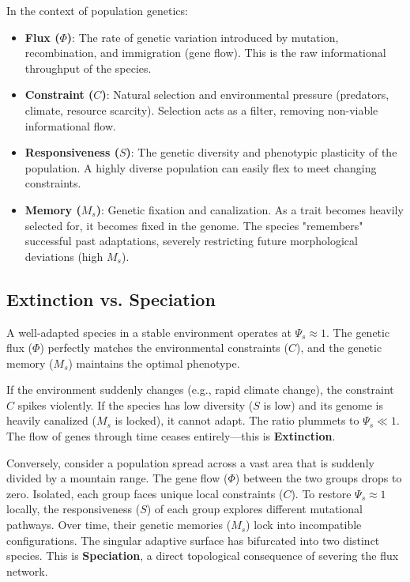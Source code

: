\documentclass[11pt,a4paper]{article}
\begin{document}
In the context of population genetics:
\begin{itemize}
    \item \textbf{Flux ($\Phi$)}: The rate of genetic variation introduced by mutation, recombination, and immigration (gene flow). This is the raw informational throughput of the species.
    \item \textbf{Constraint ($C$)}: Natural selection and environmental pressure (predators, climate, resource scarcity). Selection acts as a filter, removing non-viable informational flow.
    \item \textbf{Responsiveness ($S$)}: The genetic diversity and phenotypic plasticity of the population. A highly diverse population can easily flex to meet changing constraints.
    \item \textbf{Memory ($M_s$)}: Genetic fixation and canalization. As a trait becomes heavily selected for, it becomes fixed in the genome. The species "remembers" successful past adaptations, severely restricting future morphological deviations (high $M_s$).
\end{itemize}

\subsection{Extinction vs. Speciation}
A well-adapted species in a stable environment operates at $\Psi_s \approx 1$. The genetic flux ($\Phi$) perfectly matches the environmental constraints ($C$), and the genetic memory ($M_s$) maintains the optimal phenotype.

If the environment suddenly changes (e.g., rapid climate change), the constraint $C$ spikes violently. If the species has low diversity ($S$ is low) and its genome is heavily canalized ($M_s$ is locked), it cannot adapt. The ratio plummets to $\Psi_s \ll 1$. The flow of genes through time ceases entirely---this is \textbf{Extinction}.

Conversely, consider a population spread across a vast area that is suddenly divided by a mountain range. The gene flow ($\Phi$) between the two groups drops to zero. Isolated, each group faces unique local constraints ($C$). To restore $\Psi_s \approx 1$ locally, the responsiveness ($S$) of each group explores different mutational pathways. Over time, their genetic memories ($M_s$) lock into incompatible configurations. The singular adaptive surface has bifurcated into two distinct species. This is \textbf{Speciation}, a direct topological consequence of severing the flux network.
\end{document}
